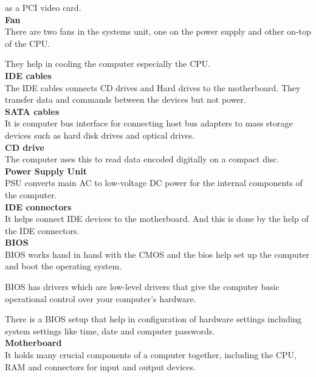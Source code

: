 \documentclass{article}
\begin{document}
as a PCI video card.\\
\textbf{Fan}\\
There are two fans in the systems unit, one on the power supply and other on-top of the CPU.
\par They help in cooling the computer especially the CPU.\\
\textbf{IDE cables}\\
The IDE cables connects CD drives and Hard drives to the motherboard. They transfer data and commands between the devices but not power.\\
\textbf{SATA cables}\\
It is computer bus interface for connecting host bus adapters to mass storage devices such as hard disk drives and optical drives.\\
\textbf{CD drive}\\
The computer uses this to read data encoded digitally on a compact disc.\\
\textbf{Power Supply Unit}\\
PSU converts main AC to low-voltage DC power for the internal components of the computer.\\
\textbf{IDE connectors}\\
It helps connect IDE devices to the motherboard. And this is done by the help of the IDE connectors.\\
\textbf{BIOS}\\
BIOS works hand in hand with the CMOS and the bios help set up the computer and boot the operating system.
\par BIOS has drivers which are low-level drivers that give the computer basic operational control over your computer’s hardware.
\par There is a BIOS setup that help in configuration of hardware settings including system settings like time, date and computer passwords.\\
\textbf{Motherboard}\\
It holds many crucial components of a computer together, including the CPU, RAM and connectors for input and output devices.
\end{document}
